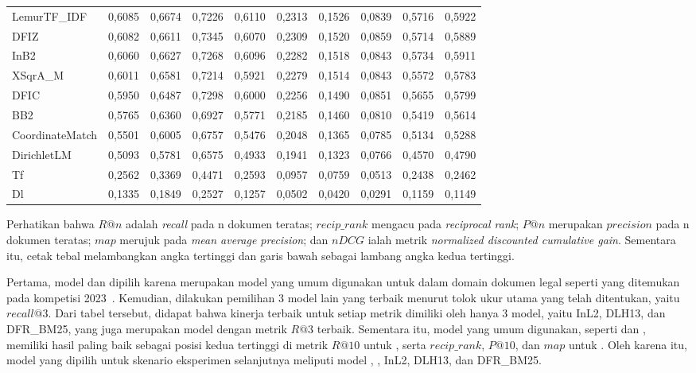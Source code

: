 \begin{table}
{\begin{tabular}{lrrrrrrrrr}
	LemurTF\_IDF & 0,6085 & 0,6674 & 0,7226 & 0,6110 & 0,2313 & 0,1526 & 0,0839 & 0,5716 & 0,5922 \\
	DFIZ & 0,6082 & 0,6611 & 0,7345 & 0,6070 & 0,2309 & 0,1520 & 0,0859 & 0,5714 & 0,5889 \\
	InB2 & 0,6060 & 0,6627 & 0,7268 & 0,6096 & 0,2282 & 0,1518 & 0,0843 & 0,5734 & 0,5911 \\
	XSqrA\_M & 0,6011 & 0,6581 & 0,7214 & 0,5921 & 0,2279 & 0,1514 & 0,0843 & 0,5572 & 0,5783 \\
	DFIC & 0,5950 & 0,6487 & 0,7298 & 0,6000 & 0,2256 & 0,1490 & 0,0851 & 0,5655 & 0,5799 \\
	BB2 & 0,5765 & 0,6360 & 0,6927 & 0,5771 & 0,2185 & 0,1460 & 0,0810 & 0,5419 & 0,5614 \\
	CoordinateMatch & 0,5501 & 0,6005 & 0,6757 & 0,5476 & 0,2048 & 0,1365 & 0,0785 & 0,5134 & 0,5288 \\
	DirichletLM & 0,5093 & 0,5781 & 0,6575 & 0,4933 & 0,1941 & 0,1323 & 0,0766 & 0,4570 & 0,4790 \\
	Tf & 0,2562 & 0,3369 & 0,4471 & 0,2593 & 0,0957 & 0,0759 & 0,0513 & 0,2438 & 0,2462 \\
	Dl & 0,1335 & 0,1849 & 0,2527 & 0,1257 & 0,0502 & 0,0420 & 0,0291 & 0,1159 & 0,1149 \\
	\bottomrule
	\end{tabular}
    }%
\end{table}
Perhatikan bahwa \(R@n\) adalah \textit{recall} pada n dokumen teratas; \(recip\_rank\) mengacu pada \textit{reciprocal rank}; \(P@n\) merupakan \(precision\) pada n dokumen teratas; \(map\) merujuk pada \textit{mean average precision}; dan \(nDCG\) ialah metrik \textit{normalized discounted cumulative gain}. Sementara itu, cetak tebal melambangkan angka tertinggi dan garis bawah sebagai lambang angka kedua tertinggi.

Pertama, model \obm{} dan \tfidf{} dipilih karena merupakan model yang umum digunakan untuk \ir{} dalam domain dokumen legal seperti yang ditemukan pada kompetisi \COLIEE{} 2023~\citep{goebel2023summary}. Kemudian, dilakukan pemilihan 3 model lain yang terbaik menurut tolok ukur utama yang telah ditentukan, yaitu \(recall@3\). Dari tabel tersebut, didapat bahwa kinerja terbaik untuk setiap metrik dimiliki oleh hanya 3 model, yaitu InL2, DLH13, dan DFR\_BM25, yang juga merupakan model dengan metrik \(R@3\) terbaik. Sementara itu, model yang umum digunakan, seperti \obm{} dan \tfidf{}, memiliki hasil paling baik sebagai posisi kedua tertinggi di metrik \(R@10\) untuk \tfidf{}, serta \(recip\_rank\), \(P@10\), dan \(map\) untuk \obm{}. Oleh karena itu, model yang dipilih untuk skenario eksperimen selanjutnya meliputi model \obm{}, \tfidf{}, InL2, DLH13, dan DFR\_BM25.





